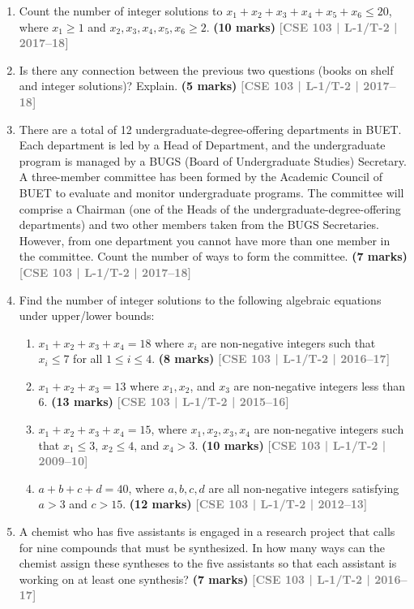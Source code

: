 \documentclass[12pt,a3paper]{article}
\newcommand{\yr}[1]{\hfill\textcolor{gray}{\small\textbf{[#1]}}}
\newcommand{\mk}[1]{\textcolor{orange!70!black}{\small\textbf{(#1 marks)}}}
\begin{document}
\begin{enumerate}
\item Count the number of integer solutions to $x_1 + x_2 + x_3 + x_4 + x_5 + x_6 \leq 20$, where $x_1 \geq 1$ and $x_2, x_3, x_4, x_5, x_6 \geq 2$.
\mk{10} \yr{CSE 103 | L-1/T-2 | 2017--18}

\item Is there any connection between the previous two questions (books on shelf and integer solutions)? Explain.
\mk{5} \yr{CSE 103 | L-1/T-2 | 2017--18}

\item There are a total of 12 undergraduate-degree-offering departments in BUET. Each department is led by a Head of Department, and the undergraduate program is managed by a BUGS (Board of Undergraduate Studies) Secretary. A three-member committee has been formed by the Academic Council of BUET to evaluate and monitor undergraduate programs. The committee will comprise a Chairman (one of the Heads of the undergraduate-degree-offering departments) and two other members taken from the BUGS Secretaries. However, from one department you cannot have more than one member in the committee. Count the number of ways to form the committee.
\mk{7} \yr{CSE 103 | L-1/T-2 | 2017--18}

\item Find the number of integer solutions to the following algebraic equations under upper/lower bounds:
\begin{enumerate}
  \item $x_1 + x_2 + x_3 + x_4 = 18$ where $x_i$ are non-negative integers such that $x_i \leq 7$ for all $1 \leq i \leq 4$. \mk{8} \yr{CSE 103 | L-1/T-2 | 2016--17}
  \item $x_1 + x_2 + x_3 = 13$ where $x_1, x_2$, and $x_3$ are non-negative integers less than 6. \mk{13} \yr{CSE 103 | L-1/T-2 | 2015--16}
  \item $x_1 + x_2 + x_3 + x_4 = 15$, where $x_1, x_2, x_3, x_4$ are non-negative integers such that $x_1 \leq 3$, $x_2 \leq 4$, and $x_4 > 3$. \mk{10} \yr{CSE 103 | L-1/T-2 | 2009--10}
  \item $a + b + c + d = 40$, where $a, b, c, d$ are all non-negative integers satisfying $a > 3$ and $c > 15$. \mk{12} \yr{CSE 103 | L-1/T-2 | 2012--13}
\end{enumerate}

\item A chemist who has five assistants is engaged in a research project that calls for nine compounds that must be synthesized. In how many ways can the chemist assign these syntheses to the five assistants so that each assistant is working on at least one synthesis?
\mk{7} \yr{CSE 103 | L-1/T-2 | 2016--17}


\end{enumerate}
\end{document}
